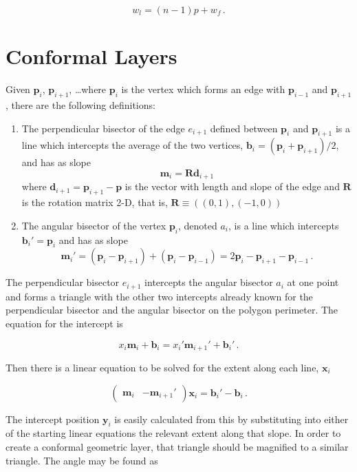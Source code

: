 \documentclass{article}
\begin{document}
$$ w_l = (n-1)p + w_f\,. $$


\section{Conformal Layers}

Given $\mathbf{p}_i$, $\mathbf{p}_{i+1}$, \ldots where $\mathbf{p}_i$ is the vertex which forms an edge with $\mathbf{p}_{i-1}$ and $\mathbf{p}_{i+1}$, there are the following definitions:

\begin{enumerate}
    \item The perpendicular bisector of the edge $e_{i+1}$ defined between $\mathbf{p}_i$ and $\mathbf{p}_{i+1}$ is a line which intercepts the average of the two vertices, $\mathbf{b}_i = (\mathbf{p}_i + \mathbf{p}_{i+1})/2$, and has as slope $$\mathbf{m}_i = \mathbf{R}\mathbf{d}_{i+1}$$ where $\mathbf{d}_{i+1} = \mathbf{p}_{i+1} - \mathbf{p}$ is the vector with length and slope of the edge and $\mathbf{R}$ is the rotation matrix 2-D, that is, $\mathbf{R} \equiv ((0,1),(-1,0))$
    \item The angular bisector of the vertex $\mathbf{p}_i$, denoted $a_i$, is a line which intercepts $\mathbf{b}_i' = \mathbf{p}_i$ and has as slope 
        $$ \mathbf{m}_i' = (\mathbf{p}_i - \mathbf{p}_{i+1}) + (\mathbf{p}_i - \mathbf{p}_{i-1})  = 2\mathbf{p}_i - \mathbf{p}_{i+1} - \mathbf{p}_{i-1} \,. $$
\end{enumerate}

The perpendicular bisector $e_{i+1}$ intercepts the angular bisector $a_i$ at one point and forms a triangle with the other two intercepts already known for the perpendicular bisector and the angular bisector on the polygon perimeter. The equation for the intercept is

$$ x_i \mathbf{m}_i + \mathbf{b}_{i} = x_i' \mathbf{m}_{i+1}' + \mathbf{b}_i'\,.$$

Then there is a linear equation to be solved for the extent along each line, $\mathbf{x}_i$

$$ \begin{pmatrix} \mathbf{m}_i & -\mathbf{m}_{i+1}' \end{pmatrix} \mathbf{x}_i = \mathbf{b}_i' - \mathbf{b}_i \,.$$

    The intercept position $\mathbf{y}_i$ is easily calculated from this by substituting into either of the starting linear equations the relevant extent along that slope. In order to create a conformal geometric layer, that triangle should be magnified to a similar triangle. The angle may be found as 
\end{document}
